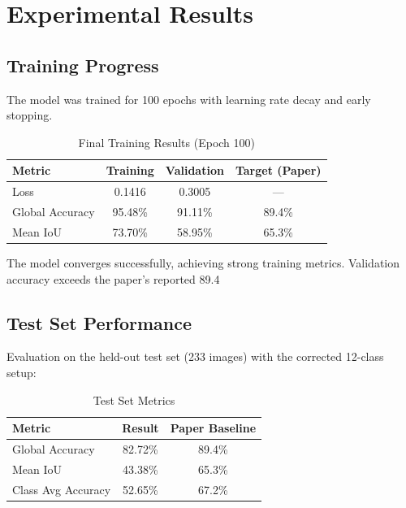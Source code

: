 \documentclass[11pt,a4paper]{report}
\begin{document}
\chapter{Experimental Results}

\section{Training Progress}

The model was trained for 100 epochs with learning rate decay and early stopping.

\begin{table}[H]
\centering
\caption{Final Training Results (Epoch 100)}
\label{tab:train-results}
\begin{tabular}{lccc}
\toprule
\rowcolor{tableheader}
\textbf{Metric} & \textbf{Training} & \textbf{Validation} & \textbf{Target (Paper)} \\
\midrule
Loss & 0.1416 & 0.3005 & — \\
Global Accuracy & 95.48\% & 91.11\% & 89.4\% \\
Mean IoU & 73.70\% & 58.95\% & 65.3\% \\
\bottomrule
\end{tabular}
\end{table}

The model converges successfully, achieving strong training metrics. Validation accuracy exceeds the paper's reported 89.4%

\section{Test Set Performance}

Evaluation on the held-out test set (233 images) with the corrected 12-class setup:

\begin{table}[H]
\centering
\caption{Test Set Metrics}
\label{tab:test-results}
\begin{tabular}{lcc}
\toprule
\rowcolor{tableheader}
\textbf{Metric} & \textbf{Result} & \textbf{Paper Baseline} \\
\midrule
Global Accuracy & 82.72\% & 89.4\% \\
Mean IoU & 43.38\% & 65.3\% \\
Class Avg Accuracy & 52.65\% & 67.2\% \\
\bottomrule
\end{tabular}
\end{table}
\end{document}
